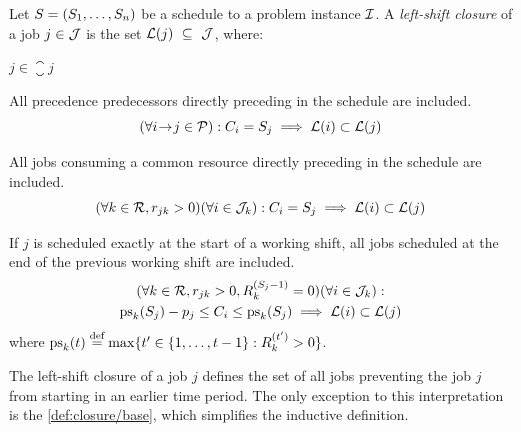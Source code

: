 \begin{defn} \label{def:left-shift-closure}
    Let $S = (S_{1}, \dots, S_{n})$ be a schedule to a problem instance $\mathcal{I}$.
    A \emph{left-shift closure} of a job $j \in \mathcal{J}$ is the set $\mathcal{L}(j)~\subseteq~\mathcal{J}$, where:
    \begin{conditions}
        \item
            $j \in \closure{j}$ \label{def:closure/base}

        \item
            All precedence predecessors directly preceding in the schedule are included.
            $$
            (\forall i \hspace{-0.2em} \rightarrow \hspace{-0.2em} j \in \mathcal{P}):
            C_{i} = S_{j} \implies \mathcal{L}(i) \subset \mathcal{L}(j)
            $$ \label{def:closure/precedence}
            \vspace{-2em}

        \item
            All jobs consuming a common resource directly preceding in the schedule are included.
            $$
            (\forall k \in \mathcal{R}, r_{j k} > 0)
            (\forall i \in \mathcal{J}_{k}):
            C_{i} = S_{j} \implies \mathcal{L}(i) \subset \mathcal{L}(j)
            $$ \label{def:closure/resource-precedence}
            \vspace{-2em}

        \item
            If $j$ is scheduled exactly at the start of a working shift,
            all jobs scheduled at the end of the previous working shift are included.
            \begin{multline*}
            (\forall k \in \Resources, \consumption{j}{k} > 0, \capacity{k}{\jobstart{j}-1} = 0)
            (\forall i \in \JobsOnResource{k}):
            \\
            \mathrm{ps}_k(\jobstart{j}) - \duration{j} \leq \jobend{i} \leq \mathrm{ps}_k(\jobstart{j})
            \implies \closure{i} \subset \closure{j}
            \end{multline*} \label{def:closure/shift-pause-precedence}
            where $\mathrm{ps}_k(t) \defeq \max\{t^\prime \in \intinterval{1}{t-1} : \capacity{k}{t^\prime} > 0\}$.
    \end{conditions}
\end{defn}

The left-shift closure of a job $j$ defines the set of all jobs
preventing the job $j$ from starting in an earlier time period.
The only exception to this interpretation is the \cref{def:closure/base},
which simplifies the inductive definition.

